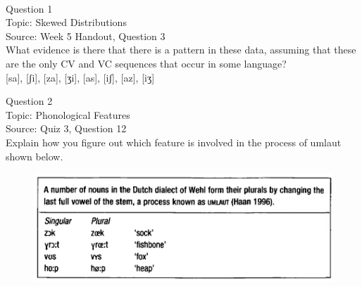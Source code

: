 \documentclass[12pt]{article}
\begin{document}
\newpage

\begin{center}
\textbf{{\color{red}{\HUGE END OF EXAM}}}\\

\end{center}
\newpage

\begin{center}
\textbf{{\color{blue}{\HUGE START OF EXAM\\}}}

\textbf{{\color{blue}{\HUGE Student ID: 18870\\}}}

\textbf{{\color{blue}{\HUGE 4:10\\}}}

\end{center}
\newpage

{\large Question 1}\\

Topic: Skewed Distributions\\
Source: Week 5 Handout, Question 3\\

What evidence is there that there is a pattern in these data, assuming that these are the only CV and VC sequences that occur in some language?\\

{[sa]}, {[ʃi]}, {[za]}, {[ʒi]}, {[as]}, {[iʃ]}, {[az]}, {[iʒ]}


\newpage

{\large Question 2}\\

Topic: Phonological Features\\
Source: Quiz 3, Question 12\\

Explain how you figure out which feature is involved in the process of umlaut shown below.\\

\begin{figure}[H]
\includegraphics{../images/dutch.png}
\end{figure}
\end{document}

